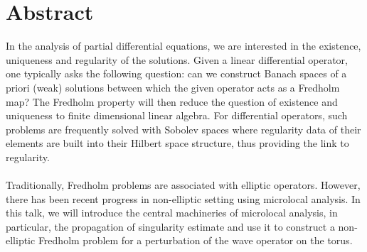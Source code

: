 \documentclass{article}
\begin{document}
 




\appendix
\section*{Abstract}


In the analysis of partial differential equations, we are interested in the existence, uniqueness and regularity of the solutions. Given a linear differential operator, one typically asks the following question: can we construct Banach spaces of a priori (weak) solutions between which the given operator acts as a Fredholm map? The Fredholm property will then reduce the question of existence and uniqueness to finite dimensional linear algebra. For differential operators, such problems are frequently solved with Sobolev spaces where regularity data of their elements are built into their Hilbert space structure, thus providing the link to regularity. \\
\\
Traditionally, Fredholm problems are associated with elliptic operators. However, there has been recent progress in non-elliptic setting using microlocal analysis. In this talk, we will introduce the central machineries of microlocal analysis, in particular, the propagation of singularity estimate and use it to construct a non-elliptic Fredholm problem for a perturbation of the wave operator on the torus.
\end{document}
